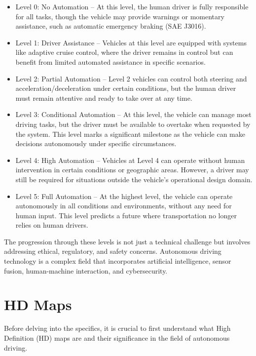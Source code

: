 \begin{itemize}
    \item Level 0: No Automation – At this level, the human driver is fully responsible for all tasks, though the vehicle may provide warnings or momentary assistance, such as automatic emergency braking (SAE J3016).
    \item Level 1: Driver Assistance – Vehicles at this level are equipped with systems like adaptive cruise control, where the driver remains in control but can benefit from limited automated assistance in specific scenarios.
    \item Level 2: Partial Automation – Level 2 vehicles can control both steering and acceleration/deceleration under certain conditions, but the human driver must remain attentive and ready to take over at any time.
    \item Level 3: Conditional Automation – At this level, the vehicle can manage most driving tasks, but the driver must be available to overtake when requested by the system. This level marks a significant milestone as the vehicle can make decisions autonomously under specific circumstances.
    \item Level 4: High Automation – Vehicles at Level 4 can operate without human intervention in certain conditions or geographic areas. However, a driver may still be required for situations outside the vehicle's operational design domain.
    \item Level 5: Full Automation – At the highest level, the vehicle can operate autonomously in all conditions and environments, without any need for human input. This level predicts a future where transportation no longer relies on human drivers.
\end{itemize}

The progression through these levels is not just a technical challenge but involves addressing ethical, regulatory, and safety concerns. Autonomous driving technology is a complex field that incorporates artificial intelligence, sensor fusion, human-machine interaction, and cybersecurity.

\section{HD Maps}


Before delving into the specifics, it is crucial to first understand what High Definition (HD) maps are and their significance in the field of autonomous driving.

